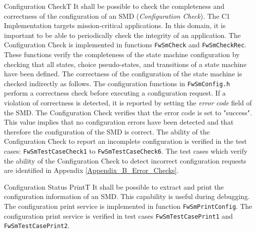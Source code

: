 \documentclass[a4paper,10pt]{article}
\newenvironment{fw_req}[6]
{\addtocounter{subsubsection}{1}
	\hspace{0.2cm}\textbf{FW-\arabic{section}.\arabic{subsection}.\arabic{subsubsection}/#2
	\hspace{0.8cm} #1}
	\vspace{-10pt}
\begin{longtable}{p{2.7cm}P{8.5cm}}
\hline
\textsc{Requirement} & #3 \\
\textsc{Justification} & #4 \\
\textsc{Implementation} & #5  \\ 
\textsc{Verification} & #6  \\
\hline
}
{\end{longtable}}
\begin{document}
\begin{fw_req}{Configuration Check}{T}
{It shall be possible to check the completeness and correctness of the configuration of an SMD (\emph{Configuration Check}).}
{The C1 Implementation targets mission-critical applications. 
In this domain, it is important to be able to periodically check the integrity of an application.}
{The Configuration Check is implemented in functions 
\texttt{FwSmCheck} and \texttt{FwSmCheckRec}. These functions verify 
the completeness of the state machine configuration by checking that all states, 
choice pseudo-states, and transitions of a state machine have been 
defined. The correctness of the configuration of the state machine is checked indirectly 
as follows. 
The configuration functions in \texttt{FwSmConfig.h} perform a correctness check before 
executing a configuration request. If a violation of correctness is detected, it is reported 
by setting the \emph{error code} field of the SMD. 
The Configuration Check verifies that the error code is set to "success". 
This value implies that no configuration errors have been detected and that therefore 
the configuration of the SMD is correct.} 
{The ability of the Configuration Check to report an incomplete 
configuration is verified in the test cases: \texttt{FwSmTestCaseCheck1} 
to \texttt{FwSmTestCaseCheck6}. The test cases which verify the ability of the 
Configuration Check to detect incorrect configuration requests are identified 
in Appendix \ref{Appendix_B_Error_Checks}.}
\end{fw_req}


\begin{fw_req}{Configuration Status Print}{T}
{It shall be possible to extract and print the configuration 
information of an SMD.}
{This capability is useful during debugging.}
{The configuration print service is implemented in function 
\texttt{FwSmPrintConfig}.} 
{The configuration print service is verified in test cases 
\texttt{FwSmTestCasePrint1} and \texttt{FwSmTestCasePrint2}.}
\end{fw_req}
\end{document}
